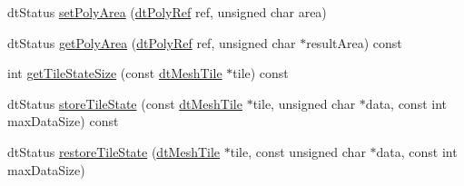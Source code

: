 \begin{Indent}
\begin{DoxyCompactItemize}
\item 
dt\+Status \hyperlink{classdtNavMesh_a74a6e65e04a87a1b6abf837349f214fb}{set\+Poly\+Area} (\hyperlink{group__detour_gab4e0b2257a670c1a800057999612b466}{dt\+Poly\+Ref} ref, unsigned char area)
\item 
dt\+Status \hyperlink{classdtNavMesh_aac53c07a2ab699b15228c91a17b3bafd}{get\+Poly\+Area} (\hyperlink{group__detour_gab4e0b2257a670c1a800057999612b466}{dt\+Poly\+Ref} ref, unsigned char $\ast$result\+Area) const
\item 
int \hyperlink{classdtNavMesh_aaf6f0b0ce2bd81c5e6cd8ac67f6a8638}{get\+Tile\+State\+Size} (const \hyperlink{structdtMeshTile}{dt\+Mesh\+Tile} $\ast$tile) const
\item 
dt\+Status \hyperlink{classdtNavMesh_a141e01263950382365468ea265f48758}{store\+Tile\+State} (const \hyperlink{structdtMeshTile}{dt\+Mesh\+Tile} $\ast$tile, unsigned char $\ast$data, const int max\+Data\+Size) const
\item 
dt\+Status \hyperlink{classdtNavMesh_aef336a67e552a9d031d669ec84029fb8}{restore\+Tile\+State} (\hyperlink{structdtMeshTile}{dt\+Mesh\+Tile} $\ast$tile, const unsigned char $\ast$data, const int max\+Data\+Size)
\end{DoxyCompactItemize}
\end{Indent}
